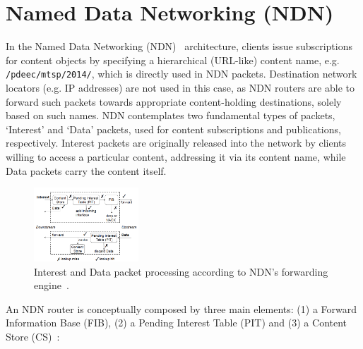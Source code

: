 \section{Named Data Networking (NDN)}
\label{sec:ndn}

In the Named Data Networking (NDN)~\cite{Jacobson2009} architecture, 
clients issue subscriptions for content 
objects by specifying 
a hierarchical (URL-like) content name, e.g. 
\verb+/pdeec+\addthinspace\verb+/mtsp/+\addthinspace\verb+2014/+, which is 
directly used in NDN packets. 
Destination network locators (e.g. IP addresses) are not used in this case, as 
NDN routers are able 
to forward such packets towards appropriate content-holding destinations, solely based 
on such names. NDN contemplates two fundamental types of packets, `Interest' and `Data' packets, 
used for content subscriptions and publications, respectively. Interest packets 
are originally released into the network by clients willing to access a 
particular content, addressing it via its content name, while Data packets 
carry the content itself.\shortvertbreak

\begin{figure}[h!]

    \centering
    \includegraphics[width=0.35\textwidth]{figures/ndn-forwarding-engine.png}
    \cprotect\caption{Interest and Data packet processing according to NDN's 
        forwarding engine~\cite{Yi2012}.}
    \label{fig:ccn-icn-ndn-forwarding-engine}

\end{figure}

An NDN router is conceptually composed by three main elements: (1) a 
Forward Information 
Base (FIB), (2) a Pending Interest Table (PIT) and (3) a Content Store 
(CS)~\cite{Jacobson2009}:

